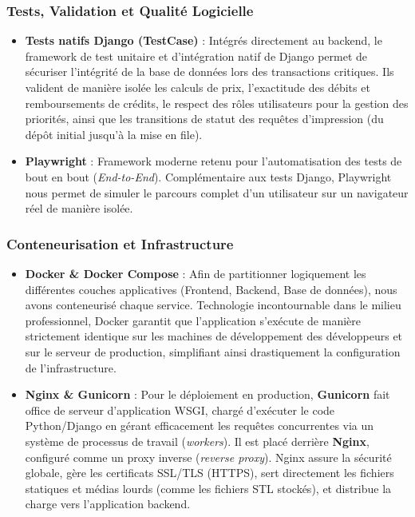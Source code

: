 \hypertarget{tests-validation-et-qualituxe9-logicielle}{%
\subsubsection{Tests, Validation et Qualité
Logicielle}\label{tests-validation-et-qualituxe9-logicielle}}

\begin{itemize}
\tightlist
\item
  \textbf{Tests natifs Django (TestCase)} : Intégrés directement au
  backend, le framework de test unitaire et d'intégration natif de
  Django permet de sécuriser l'intégrité de la base de données lors des
  transactions critiques. Ils valident de manière isolée les calculs de
  prix, l'exactitude des débits et remboursements de crédits, le respect
  des rôles utilisateurs pour la gestion des priorités, ainsi que les
  transitions de statut des requêtes d'impression (du dépôt initial
  jusqu'à la mise en file).
\item
  \textbf{Playwright} : Framework moderne retenu pour l'automatisation
  des tests de bout en bout (\emph{End-to-End}). Complémentaire aux
  tests Django, Playwright nous permet de simuler le parcours complet
  d'un utilisateur sur un navigateur réel de manière isolée.
\end{itemize}

\hypertarget{conteneurisation-et-infrastructure}{%
\subsubsection{Conteneurisation et
Infrastructure}\label{conteneurisation-et-infrastructure}}

\begin{itemize}
\tightlist
\item
  \textbf{Docker \& Docker Compose} : Afin de partitionner logiquement
  les différentes couches applicatives (Frontend, Backend, Base de
  données), nous avons conteneurisé chaque service. Technologie
  incontournable dans le milieu professionnel, Docker garantit que
  l'application s'exécute de manière strictement identique sur les
  machines de développement des développeurs et sur le serveur de
  production, simplifiant ainsi drastiquement la configuration de
  l'infrastructure.
\item
  \textbf{Nginx \& Gunicorn} : Pour le déploiement en production,
  \textbf{Gunicorn} fait office de serveur d'application WSGI, chargé
  d'exécuter le code Python/Django en gérant efficacement les requêtes
  concurrentes via un système de processus de travail (\emph{workers}).
  Il est placé derrière \textbf{Nginx}, configuré comme un proxy inverse
  (\emph{reverse proxy}). Nginx assure la sécurité globale, gère les
  certificats SSL/TLS (HTTPS), sert directement les fichiers statiques
  et médias lourds (comme les fichiers STL stockés), et distribue la
  charge vers l'application backend.
\end{itemize}

